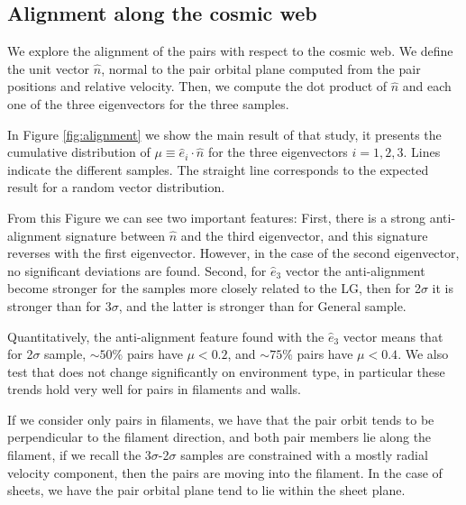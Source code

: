 \documentclass{emulateapj}
\begin{document}
\subsection{Alignment along the cosmic web}

We explore the alignment of the pairs with respect to the cosmic
web. 
We define the unit vector $\hat{n}$, normal to the pair orbital plane 
computed from the pair positions and relative velocity.
Then, we compute the dot product of $\hat{n}$ and each one of
the three eigenvectors for the three samples. 

In Figure
\ref{fig:alignment} we show the main result of that study, it
presents the cumulative distribution of
$\mu\equiv\hat{e}_i\cdot\hat{n}$ for the three eigenvectors $i=1,2,3$. 
Lines indicate the different samples.
The straight line corresponds to the expected result for a
random vector distribution. 

From this Figure we can see two important features:
First, there is a strong anti-alignment signature between $\hat{n}$ 
and the third eigenvector, and this signature reverses with the first eigenvector.
However, in the case of the second eigenvector, no significant deviations are found.
Second, for $\hat{e}_3$ vector the anti-alignment become stronger for 
the samples more closely related to the LG, then for 2$\sigma$ it is 
stronger than for 3$\sigma$, and the latter is stronger than for General 
sample. 


Quantitatively, the anti-alignment feature found with the $\hat{e}_3$ 
vector means that for 2$\sigma$ sample, $\sim 50\%$ pairs have $\mu<0.2$,
and $\sim 75\%$ pairs have $\mu<0.4$.
We also test that does not change significantly on environment type, in particular 
these trends hold very well for pairs in filaments and walls.

If we consider only pairs in filaments, we have that the pair orbit tends
to be perpendicular to the filament direction, and both pair members lie 
along the filament, if we recall the 3$\sigma$-2$\sigma$ samples are 
constrained with a mostly radial velocity component, then the pairs 
are moving into the filament.
In the case of sheets, we have the pair orbital plane  tend to lie within
 the sheet plane.
\end{document}

